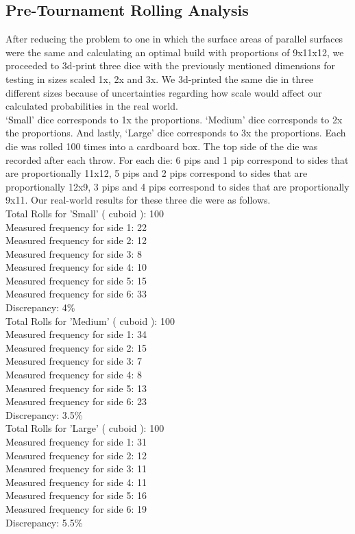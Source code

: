 \subsection{Pre-Tournament Rolling Analysis}
After reducing the problem to one in which the surface areas of parallel surfaces were the same and calculating an optimal build with proportions of 9x11x12, we proceeded to 3d-print three dice with the previously mentioned dimensions for testing in sizes scaled 1x, 2x and 3x. We 3d-printed the same die in three different sizes because of uncertainties regarding how scale would affect our calculated probabilities in the real world.\\
‘Small’ dice corresponds to 1x the proportions. ‘Medium’ dice corresponds to 2x the proportions. And lastly, ‘Large’ dice corresponds to 3x the proportions. Each die was rolled 100 times into a cardboard box. The top side of the die was recorded after each throw. For each die: 6 pips and 1 pip correspond to sides that are proportionally 11x12, 5 pips and 2 pips correspond to sides that are proportionally 12x9, 3 pips and 4 pips correspond to sides that are proportionally 9x11. Our real-world results for these three die were as follows.\\

Total Rolls for 'Small' ( cuboid ): 100\\
Measured frequency for side 1: 22\\
Measured frequency for side 2: 12\\
Measured frequency for side 3: 8\\
Measured frequency for side 4: 10\\
Measured frequency for side 5: 15\\
Measured frequency for side 6: 33\\
Discrepancy: 4\%\\

Total Rolls for 'Medium' ( cuboid ): 100\\
Measured frequency for side 1: 34\\
Measured frequency for side 2: 15\\
Measured frequency for side 3: 7\\
Measured frequency for side 4: 8\\
Measured frequency for side 5: 13\\
Measured frequency for side 6: 23\\
Discrepancy: 3.5\%\\

Total Rolls for 'Large' ( cuboid ): 100\\
Measured frequency for side 1: 31\\
Measured frequency for side 2: 12\\
Measured frequency for side 3: 11\\
Measured frequency for side 4: 11\\
Measured frequency for side 5: 16\\
Measured frequency for side 6: 19\\
Discrepancy: 5.5\%\\

